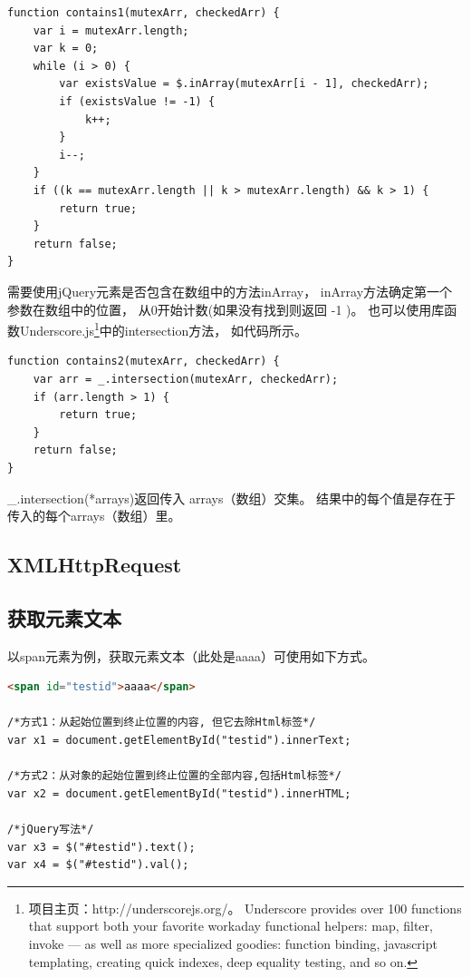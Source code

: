 \documentclass{book}
\begin{document}
\begin{lstlisting}[language=VBScript]
function contains1(mutexArr, checkedArr) {
    var i = mutexArr.length;
    var k = 0;
    while (i > 0) {
        var existsValue = $.inArray(mutexArr[i - 1], checkedArr);
        if (existsValue != -1) {
            k++;
        }
        i--;
    }
    if ((k == mutexArr.length || k > mutexArr.length) && k > 1) {
        return true;
    }
    return false;
}
\end{lstlisting}

需要使用jQuery元素是否包含在数组中的方法inArray，
inArray方法确定第一个参数在数组中的位置，
从0开始计数(如果没有找到则返回 -1 )。
也可以使用库函数Underscore.js\footnote{项目主页：http://underscorejs.org/。
Underscore provides over 100 functions that support both your favorite workaday functional helpers: 
map, filter, invoke — as well as more specialized goodies: function binding, 
javascript templating, creating quick indexes, 
deep equality testing, and so on. }中的intersection方法，
如代码所示。

\begin{lstlisting}[language=VBScript]
function contains2(mutexArr, checkedArr) {        
    var arr = _.intersection(mutexArr, checkedArr);
    if (arr.length > 1) {
        return true;
    }
    return false;
}
\end{lstlisting}

\_.intersection(*arrays)返回传入 arrays（数组）交集。
结果中的每个值是存在于传入的每个arrays（数组）里。

\subsection{XMLHttpRequest}

\subsection{获取元素文本}

以span元素为例，获取元素文本（此处是aaaa）可使用如下方式。

\begin{lstlisting}[language=HTML]
<span id="testid">aaaa</span>

/*方式1：从起始位置到终止位置的内容, 但它去除Html标签*/ 
var x1 = document.getElementById("testid").innerText;

/*方式2：从对象的起始位置到终止位置的全部内容,包括Html标签*/
var x2 = document.getElementById("testid").innerHTML;

/*jQuery写法*/ 
var x3 = $("#testid").text();
var x4 = $("#testid").val();
\end{lstlisting}
\end{document}
